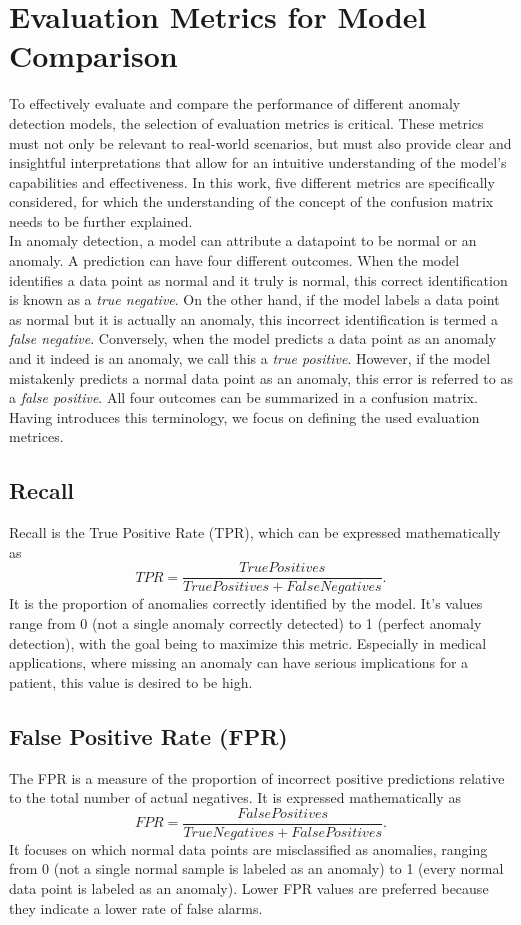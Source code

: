 \section{Evaluation Metrics for Model Comparison}
To effectively evaluate and compare the performance of different anomaly detection models, the selection of evaluation metrics is critical. These metrics must not only be relevant to real-world scenarios, but must also provide clear and insightful interpretations that allow for an intuitive understanding of the model's capabilities and effectiveness. In this work, five different metrics are specifically considered, for which the understanding of the concept of the confusion matrix needs to be further explained. \\
In anomaly detection, a model can attribute a datapoint to be normal or an anomaly. A prediction can have four different outcomes. When the model identifies a data point as normal and it truly is normal, this correct identification is known as a \textit{true negative}. On the other hand, if the model labels a data point as normal but it is actually an anomaly, this incorrect identification is termed a \textit{false negative}. Conversely, when the model predicts a data point as an anomaly and it indeed is an anomaly, we call this a \textit{true positive}. However, if the model mistakenly predicts a normal data point as an anomaly, this error is referred to as a \textit{false positive}. All four outcomes can be summarized in a confusion matrix. \\


Having introduces this terminology, we focus on defining the used evaluation metrices.
\subsection{Recall}
Recall is the True Positive Rate (TPR), which can be expressed mathematically as \[ TPR=\frac{TruePositives}{TruePositives+FalseNegatives}. \] It is the proportion of anomalies correctly identified by the model. It's values range from 0 (not a single anomaly correctly detected) to 1 (perfect anomaly detection), with the goal being to maximize this metric. Especially in medical applications, where missing an anomaly can have serious implications for a patient, this value is desired to be high.
\subsection{False Positive Rate (FPR)}
The FPR is a measure of the proportion of incorrect positive predictions relative to the total number of actual negatives. It is expressed mathematically as \[ FPR=\frac{FalsePositives}{TrueNegatives+FalsePositives}. \] It focuses on which normal data points are misclassified as anomalies, ranging from 0 (not a single normal sample is labeled as an anomaly) to 1 (every normal data point is labeled as an anomaly). Lower FPR values are preferred because they indicate a lower rate of false alarms.\\
